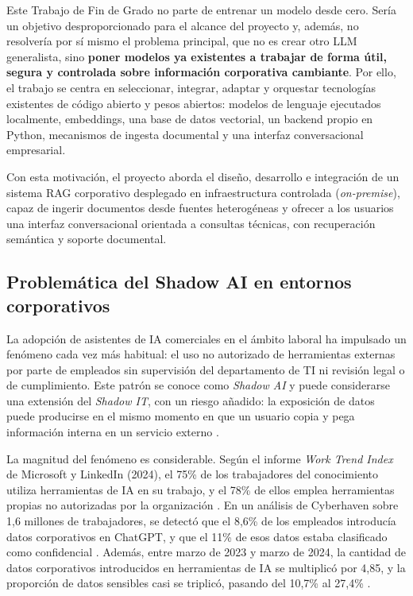 Este Trabajo de Fin de Grado no parte de entrenar un modelo desde cero. Sería un objetivo desproporcionado para el alcance del proyecto y, además, no resolvería por sí mismo el problema principal, que no es crear otro LLM generalista, sino \textbf{poner modelos ya existentes a trabajar de forma útil, segura y controlada sobre información corporativa cambiante}. Por ello, el trabajo se centra en seleccionar, integrar, adaptar y orquestar tecnologías existentes de código abierto y pesos abiertos: modelos de lenguaje ejecutados localmente, embeddings, una base de datos vectorial, un backend propio en Python, mecanismos de ingesta documental y una interfaz conversacional empresarial.

Con esta motivación, el proyecto aborda el diseño, desarrollo e integración de un sistema RAG corporativo desplegado en infraestructura controlada (\textit{on-premise}), capaz de ingerir documentos desde fuentes heterogéneas y ofrecer a los usuarios una interfaz conversacional orientada a consultas técnicas, con recuperación semántica y soporte documental.

\subsection{Problemática del Shadow AI en entornos corporativos}
\label{subsec:shadow_ai}

La adopción de asistentes de IA comerciales en el ámbito laboral ha impulsado un fenómeno cada vez más habitual: el uso no autorizado de herramientas externas por parte de empleados sin supervisión del departamento de TI ni revisión legal o de cumplimiento. Este patrón se conoce como \textit{Shadow AI} y puede considerarse una extensión del \textit{Shadow IT}, con un riesgo añadido: la exposición de datos puede producirse en el mismo momento en que un usuario copia y pega información interna en un servicio externo \cite{microsoft2024worktrend}.

La magnitud del fenómeno es considerable. Según el informe \textit{Work Trend Index} de Microsoft y LinkedIn (2024), el 75\% de los trabajadores del conocimiento utiliza herramientas de IA en su trabajo, y el 78\% de ellos emplea herramientas propias no autorizadas por la organización \cite{microsoft2024worktrend}. En un análisis de Cyberhaven sobre 1,6 millones de trabajadores, se detectó que el 8,6\% de los empleados introducía datos corporativos en ChatGPT, y que el 11\% de esos datos estaba clasificado como confidencial \cite{cyberhaven2024shadow}. Además, entre marzo de 2023 y marzo de 2024, la cantidad de datos corporativos introducidos en herramientas de IA se multiplicó por 4,85, y la proporción de datos sensibles casi se triplicó, pasando del 10,7\% al 27,4\% \cite{kalisa2024shadow}.

